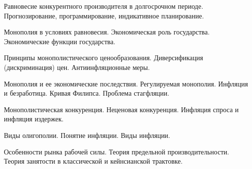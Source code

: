 \documentclass[
	14pt,
	a4paper,
	]
	{scrartcl}
\begin{document}
\vfill
\z 	Равновесие конкурентного производителя в долгосрочном периоде.
 \vfill
\z 	Прогнозирование, программирование, индикативное планирование.
 \vfill

\vfill

\newpage


\shapk
{}
\setcounter{zad}{0}

\vfill
\z 	Монополия в условиях равновесия.
 \vfill
\z 	Экономическая роль государства. Экономические функции государства.
 \vfill

\vfill

\newpage


\shapk
{}
\setcounter{zad}{0}

\vfill
\z 	Принципы монополистического ценообразования.  Диверсификация  (дискриминация) цен.
 \vfill
\z 	Антиинфляционные меры.
 \vfill

\vfill

\newpage


\shapk
{}
\setcounter{zad}{0}

\vfill
\z 	Монополия и ее экономические последствия.  Регулируемая монополия.
 \vfill
\z 	Инфляция и безработица.  Кривая Филипса. Проблема стагфляции.
 \vfill

\vfill

\newpage


\shapk
{}
\setcounter{zad}{0}

\vfill
\z 	Монополистическая конкуренция.  Неценовая конкуренция.
 \vfill
\z 	Инфляция спроса и инфляция издержек.
 \vfill

\vfill

\newpage


\shapk
{}
\setcounter{zad}{0}

\vfill
\z 	Виды олигополии.
 \vfill
\z 	Понятие инфляции. Виды инфляции.
 \vfill

\vfill

\newpage


\shapk
{}
\setcounter{zad}{0}

\vfill
\z 	Особенности рынка рабочей силы.  Теория предельной производительности.
 \vfill
\z 	Теория занятости в классической и кейнсианской трактовке. 
 \vfill

\vfill

\newpage


\shapk
{}
\setcounter{zad}{0}
\end{document}
